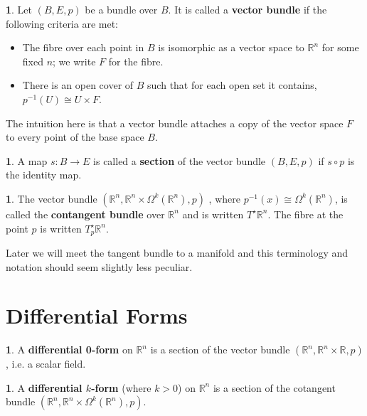 \documentclass[oneside,english]{amsbook}
\numberwithin{section}{chapter}
\theoremstyle{plain}
\theoremstyle{definition}
\newtheorem{defn}[thm]{\protect\definitionname}
\providecommand{\definitionname}{Definition}
\begin{document}
			\begin{defn}
				Let $(B, E, p)$ be a bundle over $B$. It is called a \textbf{vector bundle} if the following criteria are met:
				\begin{itemize}
					\item The fibre over each point in $B$ is isomorphic as a vector space to $\mathbb{R}^n$ for some fixed $n$; we write $F$ for the fibre.
					\item There is an open cover of $B$ such that for each open set it contains, $p^{-1}(U)\cong U\times F$.
				\end{itemize}
			\end{defn}
			
			The intuition here is that a vector bundle attaches a copy of the vector space $F$ to every point of the base space $B$.
			
			\begin{defn}
				A map $s:B\to E$ is called a \textbf{section} of the vector bundle $(B, E, p)$ if $s\circ p$ is the identity map.
			\end{defn}
			
			\begin{defn}
				The vector bundle $(\mathbb{R}^n, \mathbb{R}^n\times \Omega^k(\mathbb{R}^n), p)$ , where $p^{-1}(x)\cong \Omega^k(\mathbb{R}^n)$, is called the \textbf{contangent bundle} over $\mathbb{R}^n$ and is written $T^\star\mathbb{R}^n$. The fibre at the point $p$ is written $T_p^\star\mathbb{R}^n$.
			\end{defn}
			
			Later we will meet the tangent bundle to a manifold and this terminology and notation should seem slightly less peculiar.
			
		\section{Differential Forms}
		
			\begin{defn}
				A \textbf{differential 0-form} on $\mathbb{R}^n$ is a section of the vector bundle $(\mathbb{R}^n, \mathbb{R}^n\times \mathbb{R}, p)$, i.e. a scalar field.
			\end{defn}

			\begin{defn}
				A \textbf{differential $k$-form} (where $k > 0$) on $\mathbb{R}^n$ is a section of the cotangent bundle $(\mathbb{R}^n, \mathbb{R}^n\times \Omega^k(\mathbb{R}^n), p)$.
			\end{defn}
			
\end{document}
